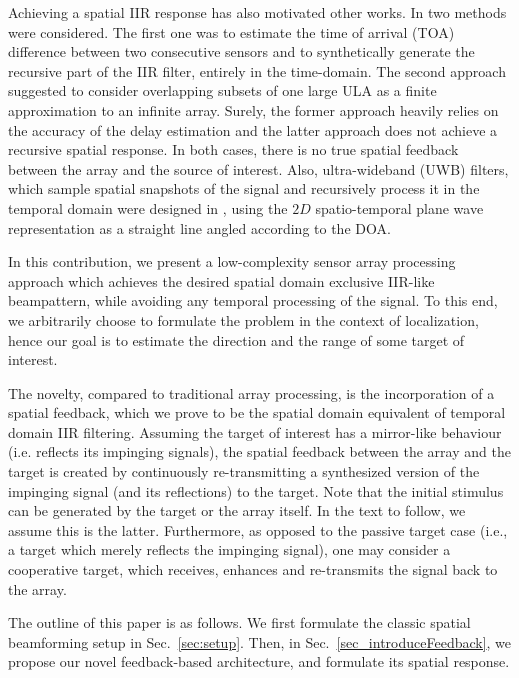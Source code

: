 \par Achieving a spatial IIR response has also motivated other works.
In \cite{wen2013extending} two methods were considered.
The first one was to estimate the time of arrival (TOA) difference between two consecutive sensors and to synthetically generate the recursive part of the IIR filter, entirely in the time-domain. The second approach suggested to consider overlapping subsets of one large ULA as a finite approximation to an infinite array. 
Surely, the former approach heavily relies on the accuracy of the delay estimation and the latter approach does not achieve a recursive spatial response. In both cases, there is no true spatial feedback between the array and the source of interest.
Also, ultra-wideband (UWB) filters, which sample spatial snapshots of the signal and recursively process it in the temporal domain were designed in \cite{bruton1983highly}, using the $2D$ spatio-temporal plane wave representation as a straight line angled according to the DOA.
\par In this contribution, we present a low-complexity sensor array processing approach which achieves the desired spatial domain exclusive IIR-like beampattern, while avoiding any temporal processing of the signal.
To this end, we arbitrarily choose to formulate the problem in the context of localization, hence our goal is to estimate the direction and the range of some target of interest. 
\par The novelty, compared to traditional array processing, is the incorporation of a spatial feedback, which we prove to be the spatial domain equivalent of temporal domain IIR filtering.
Assuming the target of interest has a mirror-like behaviour (i.e. reflects its impinging signals), the spatial feedback between the array and the target is created by continuously re-transmitting a synthesized version of the impinging signal (and its reflections) to the target.
Note that the initial stimulus can be generated by the target or the array itself. In the text to follow, we assume this is the latter. 
Furthermore, as opposed to the passive target case (i.e., a target which merely reflects the impinging signal), one may consider a cooperative target, which receives, enhances and re-transmits the signal back to the array. 
\par The outline of this paper is as follows. We first formulate the classic spatial beamforming setup in Sec.~\ref{sec:setup}. Then, in Sec.~\ref{sec_introduceFeedback}, we propose our novel feedback-based architecture, and formulate its spatial response.
